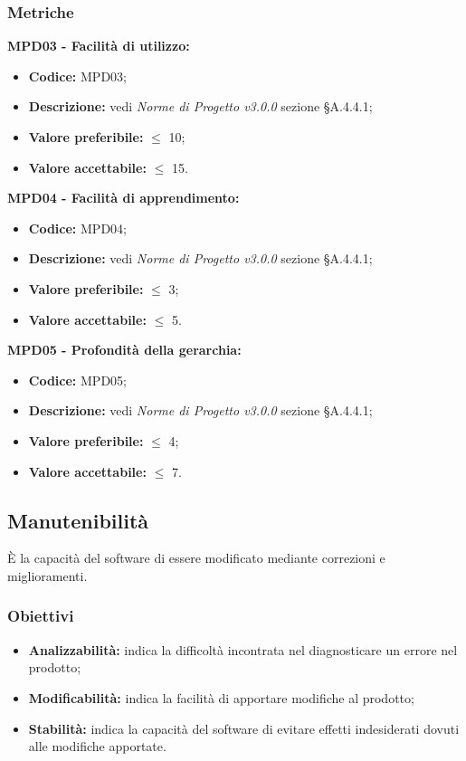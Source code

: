 \subsubsection{Metriche}
\textbf{MPD03 - Facilità di utilizzo:}
\begin{itemize}
    \item \textbf{Codice:} MPD03;
    \item \textbf{Descrizione:} vedi \textit{Norme di Progetto v3.0.0} sezione \S A.4.4.1;
    \item \textbf{Valore preferibile:} $\leq$ 10;
    \item \textbf{Valore accettabile:} $\leq$ 15.
\end{itemize}
\textbf{MPD04 - Facilità di apprendimento:}
\begin{itemize}
    \item \textbf{Codice:} MPD04;
    \item \textbf{Descrizione:} vedi \textit{Norme di Progetto v3.0.0} sezione \S A.4.4.1;
    \item \textbf{Valore preferibile:} $\leq$ 3;
    \item \textbf{Valore accettabile:} $\leq$ 5.
\end{itemize}
\textbf{MPD05 - Profondità della gerarchia:}
\begin{itemize}
    \item \textbf{Codice:} MPD05;
    \item \textbf{Descrizione:} vedi \textit{Norme di Progetto v3.0.0} sezione \S A.4.4.1;
    \item \textbf{Valore preferibile:} $\leq$ 4;
    \item \textbf{Valore accettabile:} $\leq$ 7.
\end{itemize}
\subsection{Manutenibilità}
È la capacità del software di essere modificato mediante correzioni e miglioramenti.
\subsubsection{Obiettivi}
\begin{itemize}
    \item \textbf{Analizzabilità:} indica la difficoltà incontrata nel diagnosticare un errore nel prodotto;
    \item \textbf{Modificabilità:} indica la facilità di apportare modifiche al prodotto;
    \item \textbf{Stabilità:} indica la capacità del software di evitare effetti indesiderati dovuti alle modifiche apportate.
\end{itemize}
